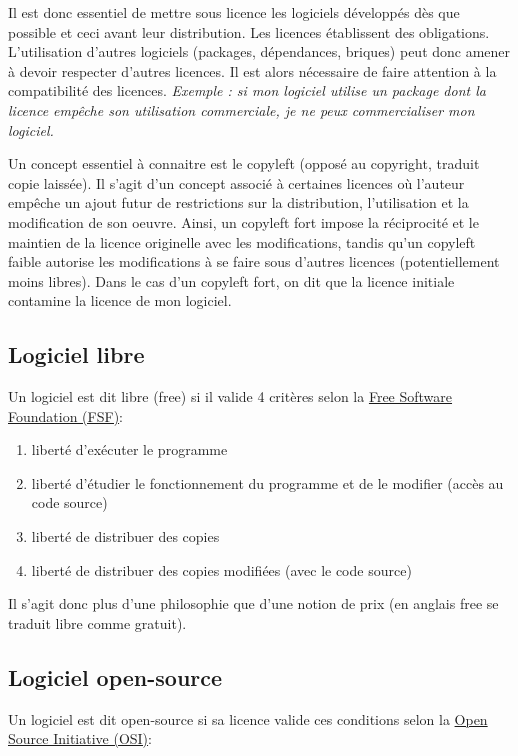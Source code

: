 \documentclass[12pt, colorinlistoftodos]{article}
\begin{document}
Il est donc essentiel de mettre sous licence les logiciels développés dès que possible et ceci avant leur distribution.
Les licences établissent des obligations. L'utilisation d'autres logiciels (packages, dépendances, briques)
peut donc amener à devoir respecter d'autres licences.
Il est alors nécessaire de faire attention à la compatibilité des licences.
\textit{Exemple : si mon logiciel utilise un package dont la licence empêche son utilisation commerciale, je ne peux commercialiser mon logiciel.}

Un concept essentiel à connaitre est le copyleft (opposé au copyright, traduit copie laissée). 
Il s'agit d'un concept associé à certaines licences où l'auteur empêche un ajout futur de restrictions sur 
la distribution, l'utilisation et la modification de son oeuvre. 
Ainsi, un copyleft fort impose la réciprocité et le maintien de la licence originelle avec les modifications,
tandis qu'un copyleft faible autorise les modifications à se faire sous d'autres licences (potentiellement moins libres).
Dans le cas d'un copyleft fort, on dit que la licence initiale contamine la licence de mon logiciel.

\subsection*{Logiciel libre}

Un logiciel est dit libre (free) si il valide 4 critères selon la 
\href{https://www.gnu.org/philosophy/free-sw.html#four-freedoms}{Free Software Foundation (FSF)}:

\begin{enumerate}
    \item liberté d'exécuter le programme
    \item liberté d'étudier le fonctionnement du programme et de le modifier (accès au code source)
    \item liberté de distribuer des copies
    \item liberté de distribuer des copies modifiées (avec le code source)
\end{enumerate}

Il s'agit donc plus d'une philosophie que d'une notion de prix (en anglais free se traduit libre comme gratuit).

\subsection*{Logiciel open-source}

Un logiciel est dit open-source si sa licence valide ces conditions selon la 
\href{https://opensource.org/docs/osd}{Open Source Initiative (OSI)}:
\end{document}

